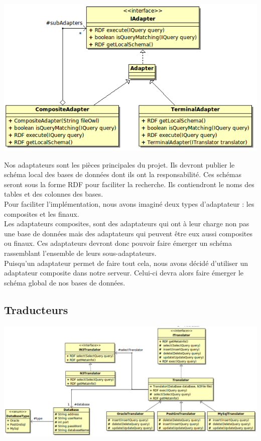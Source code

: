 \documentclass[12pt]{article}
\begin{document}
\begin{center}
	\includegraphics[scale=0.70]{images/Adapter.png}
\end{center}

	Nos adaptateurs sont les pièces principales du projet. Ils devront publier le schéma local des bases de données dont ils ont la responsabilité. Ces schémas seront sous la forme RDF pour faciliter la recherche. Ils contiendront le noms des tables et des colonnes des bases.\\
	\indent Pour faciliter l'implémentation, nous avons imaginé deux types d'adaptateur : les composites et les finaux. \\
	\indent Les adaptateurs composites, sont des adaptateurs qui ont à leur charge non pas une base de données mais des adaptateurs qui peuvent être eux aussi composites ou finaux. Ces adaptateurs devront donc pouvoir faire émerger un schéma rassemblant l'ensemble de leurs sous-adaptateurs.\\
	\indent Puisqu'un adaptateur permet de faire tout cela, nous avons décidé d'utiliser un adaptateur composite dans notre serveur. Celui-ci devra alors faire émerger le schéma global de nos bases de données.

\subsection{Traducteurs}

\begin{center}
	\includegraphics[scale=0.45]{images/Translator.png}
\end{center}
\end{document}
